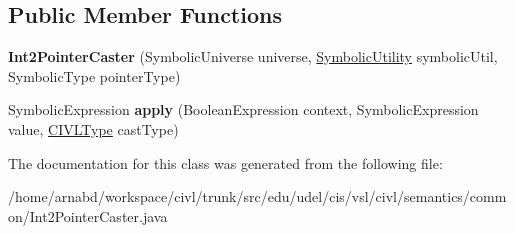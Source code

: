 \subsection*{Public Member Functions}
\begin{DoxyCompactItemize}
\item 
\hypertarget{classedu_1_1udel_1_1cis_1_1vsl_1_1civl_1_1semantics_1_1common_1_1Int2PointerCaster_a64e70027c6cdf80a9e807c0d18fc67de}{}{\bfseries Int2\+Pointer\+Caster} (Symbolic\+Universe universe, \hyperlink{interfaceedu_1_1udel_1_1cis_1_1vsl_1_1civl_1_1dynamic_1_1IF_1_1SymbolicUtility}{Symbolic\+Utility} symbolic\+Util, Symbolic\+Type pointer\+Type)\label{classedu_1_1udel_1_1cis_1_1vsl_1_1civl_1_1semantics_1_1common_1_1Int2PointerCaster_a64e70027c6cdf80a9e807c0d18fc67de}

\item 
\hypertarget{classedu_1_1udel_1_1cis_1_1vsl_1_1civl_1_1semantics_1_1common_1_1Int2PointerCaster_a86e2172c6aa3f616774d182e245795d9}{}Symbolic\+Expression {\bfseries apply} (Boolean\+Expression context, Symbolic\+Expression value, \hyperlink{interfaceedu_1_1udel_1_1cis_1_1vsl_1_1civl_1_1model_1_1IF_1_1type_1_1CIVLType}{C\+I\+V\+L\+Type} cast\+Type)\label{classedu_1_1udel_1_1cis_1_1vsl_1_1civl_1_1semantics_1_1common_1_1Int2PointerCaster_a86e2172c6aa3f616774d182e245795d9}

\end{DoxyCompactItemize}


The documentation for this class was generated from the following file\+:\begin{DoxyCompactItemize}
\item 
/home/arnabd/workspace/civl/trunk/src/edu/udel/cis/vsl/civl/semantics/common/Int2\+Pointer\+Caster.\+java\end{DoxyCompactItemize}

